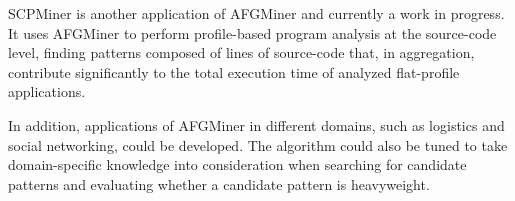SCPMiner is another application of AFGMiner and currently a work in progress. It uses AFGMiner to perform profile-based program analysis at the source-code level, finding patterns composed of lines of source-code that, in aggregation, contribute significantly to the total execution time of analyzed flat-profile applications.

In addition, applications of AFGMiner in different domains, such as logistics and social networking, could be developed. The algorithm could also be tuned to take domain-specific knowledge into consideration when searching for candidate patterns and evaluating whether a candidate pattern is heavyweight.